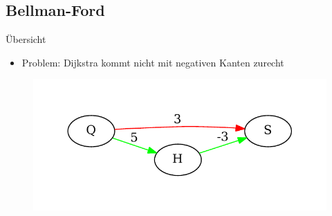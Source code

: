\subsection{Bellman-Ford}
\begin{frame}{Übersicht}

\begin{itemize}
\itemsep1pt\parskip0pt
\item
  Problem: Dijkstra kommt nicht mit negativen Kanten zurecht
\end{itemize}

\begin{figure}[htbp]
\centering
\includegraphics[width=\linewidth]{dijkstra_gegenbeispiel.pdf}
\end{figure}

\end{frame}

